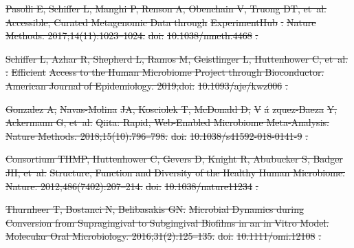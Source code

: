\documentclass[10pt,letterpaper]{article}
\providecommand{\DIFdeltex}[1]{{\protect\color{red}\sout{#1}}}                      %
\providecommand{\DIFdel}[1]{\texorpdfstring{\DIFdeltex{#1}}{}} %
\begin{document}
\DIFdel{Pasolli E, Schiffer L, Manghi P, Renson A, Obenchain V, Truong DT, et~al.
}%
\DIFdel{Accessible, Curated Metagenomic Data through }%
\DIFdel{ExperimentHub}%
\DIFdel{.
}%
\DIFdel{Nature Methods. 2017;14(11):1023--1024.
}%
\DIFdel{doi:}%
\DIFdel{10.1038/nmeth.4468}%
\DIFdel{.
}%

\DIFdel{Schiffer L, Azhar R, Shepherd L, Ramos M, Geistlinger L, Huttenhower C, et~al.
}%
\DIFdel{: }%
\DIFdel{Efficient}%
\DIFdel{Access to the Human Microbiome Project
  through Bioconductor.
}%
\DIFdel{American Journal of Epidemiology. 2019;doi:}%
\DIFdel{10.1093/aje/kwz006}%
\DIFdel{.
}%

\DIFdel{Gonzalez A, }%
\DIFdel{Navas-Molina}%
\DIFdel{JA, Kosciolek T, McDonald D, }%
\DIFdel{V}%
\DIFdel{\'a}%
\DIFdel{zquez-Baeza}%
\DIFdel{Y,
  Ackermann G, et~al.
}%
\DIFdel{Qiita: Rapid, Web-Enabled Microbiome Meta-Analysis.
}%
\DIFdel{Nature Methods. 2018;15(10):796--798.
}%
\DIFdel{doi:}%
\DIFdel{10.1038/s41592-018-0141-9}%
\DIFdel{.
}%

\DIFdel{Consortium THMP, Huttenhower C, Gevers D, Knight R, Abubucker S, Badger JH,
  et~al.
}%
\DIFdel{Structure, Function and Diversity of the Healthy Human Microbiome.
}%
\DIFdel{Nature. 2012;486(7402):207--214.
}%
\DIFdel{doi:}%
\DIFdel{10.1038/nature11234}%
\DIFdel{.
}%

\DIFdel{Thurnheer T, Bostanci N, Belibasakis GN.
}%
\DIFdel{Microbial Dynamics during Conversion from Supragingival to
  Subgingival Biofilms in an in Vitro Model.
}%
\DIFdel{Molecular Oral Microbiology. 2016;31(2):125--135.
}%
\DIFdel{doi:}%
\DIFdel{10.1111/omi.12108}%
\DIFdel{.
}%
\end{document}
